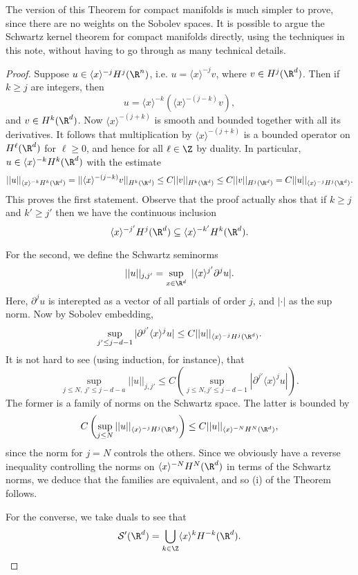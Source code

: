 \documentclass[12pt]{article}
\begin{document}
\begin{rk}The version of this Theorem for compact manifolds is much simpler to prove, since there are no weights on the Sobolev spaces. It is possible to argue the Schwartz kernel theorem for compact manifolds directly, using the techniques in this note, without having to go through as many technical details.\end{rk}
\begin{proof}

Suppose $u \in \langle x \rangle^{-j}H^{j}(\R^n)$, i.e. $u = \langle x \rangle^{-j}v$, where $v \in H^{j}(\R^d)$. Then if $k \geq j$ are integers, then
\[u = \langle x \rangle^{-k}\left(\langle x \rangle^{-(j-k)}v\right),\] and $v \in H^{k}(\R^d)$. Now $\langle x \rangle^{-(j+k)}$ is smooth and bounded together with all its derivatives. It follows that multiplication by $\langle x \rangle^{-(j+k)}$ is a bounded operator on $H^{\ell}(\R^d)$ for $\ell \geq 0$, and hence for all $\ell \in \Z$ by duality. In particular, $u \in \langle x \rangle^{-k}H^{k}(\R^d)$ with the estimate
\[||u||_{\langle x \rangle^{-k}H^{k}(\R^d)} = ||\langle x \rangle^{-(j-k)}v||_{H^k(\R^d)} \leq C||v||_{H^k(\R^d)} \leq C||v||_{H^j(\R^d)} = C||u||_{\langle x \rangle^{-j}H^j(\R^d)}.\] This proves the first statement. Observe that the proof actually shos that if $k \geq j$ and $k' \geq j'$ then we have the continuous inclusion \[\langle x \rangle^{-j'} H^{j}(\R^d) \subseteq \langle x \rangle^{-k'} H^{k}(\R^d).\] 

For the second, we define the Schwartz seminorms
\[||u||_{j,j'} = \sup_{x \in \R^d}\ |\langle x \rangle^{j'}\partial^ju|.\]
Here, $\partial^j u$ is interepted as a vector of all partials of order $j$, and $|\cdot|$ as the sup norm.
Now by Sobolev embedding,
\[\sup_{j' \leq j-d-1} |\partial^{j'}\langle x \rangle^ju| \leq C||u||_{\langle x\rangle^{-j}H^j(\R^d)}.\] It is not hard to see (using induction, for instance), that
\[\sup_{j \leq N, \ j' \leq j-d-a} ||u||_{j,j'} \leq C\left(\sup_{j \leq N, j' \leq j-d-1}|\partial^{j'}\langle x \rangle^ju|\right).\]
The former is a family of norms on the Schwartz space. The latter is bounded by
\[C\left(\sup_{j \leq N} ||u||_{\langle x\rangle^{-j}H^j(\R^d)}\right) \leq C ||u||_{\langle x \rangle^{-N}H^N(\R^d)},\] since the norm for $j=N$ controls the others. Since we obviously have a reverse inequality  controlling the norms on $\langle x \rangle^{-N}H^N(\R^d)$ in terms of the Schwartz norms, we deduce that the families are equivalent, and so (i) of the Theorem follows.

For the converse, we take duals to see that
\[\mathcal S'(\R^d) = \bigcup_{k \in \Z} \langle x \rangle^{k}H^{-k}(\R^d).\]


\end{proof}
\end{document}
